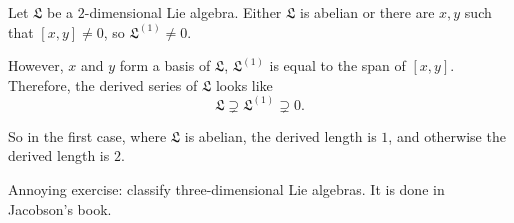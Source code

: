 Let $\mathfrak{L}$ be a $2$-dimensional Lie algebra. Either $\mathfrak{L}$ is
abelian or there are $x, y$ such that $[x, y] \neq 0$, so $\mathfrak{L}^{(1)} \neq 0$.

However, $x$ and $y$ form a basis of $\mathfrak{L}$, $\mathfrak{L}^{(1)}$ is
equal to the span of $[x, y]$. Therefore, the derived series of $\mathfrak{L}$ looks
like \[ \mathfrak{L} \supsetneq \mathfrak{L}^{(1)} \supsetneq 0. \]

So in the first case, where $\mathfrak{L}$ is abelian, the derived length is $1$,
and otherwise the derived length is $2$.

Annoying exercise: classify three-dimensional Lie algebras. It is done in
Jacobson's book.
